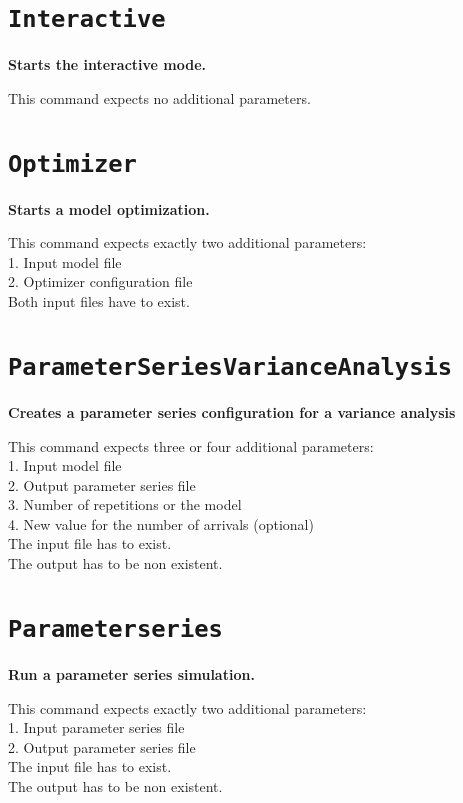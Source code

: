 \section{\texttt{Interactive}}

\textbf{Starts the interactive mode.}

This command expects no additional parameters.

\section{\texttt{Optimizer}}

\textbf{Starts a model optimization.}

This command expects exactly two additional parameters:\\
1. Input model file\\
2. Optimizer configuration file\\
Both input files have to exist.

\section{\texttt{ParameterSeriesVarianceAnalysis}}

\textbf{Creates a parameter series configuration for a variance analysis}

This command expects three or four additional parameters:\\
1. Input model file\\
2. Output parameter series file\\
3. Number of repetitions or the model\\
4. New value for the number of arrivals (optional)\\
The input file has to exist.\\
The output has to be non existent.

\section{\texttt{Parameterseries}}

\textbf{Run a parameter series simulation.}

This command expects exactly two additional parameters:\\
1. Input parameter series file\\
2. Output parameter series file\\
The input file has to exist.\\
The output has to be non existent.

